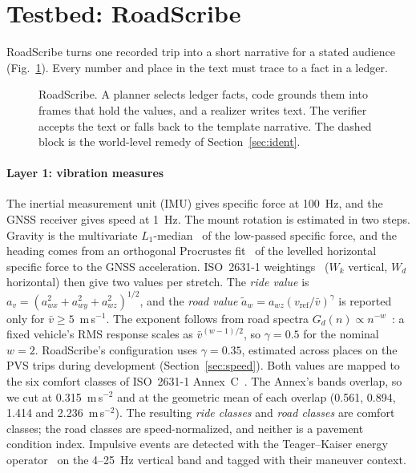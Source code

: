 \section{Testbed: RoadScribe}
\label{sec:system}

RoadScribe turns one recorded trip into a short narrative for a stated audience (Fig.~\ref{fig:arch}). Every number and place in the text must trace to a fact in a ledger.

\begin{figure}[t]
\centering

\caption{RoadScribe. A planner selects ledger facts, code grounds them into frames that hold the values, and a realizer writes text. The verifier accepts the text or falls back to the template narrative. The dashed block is the world-level remedy of Section~\ref{sec:ident}.}
\label{fig:arch}
\end{figure}

\paragraph*{Layer 1: vibration measures}
The inertial measurement unit (IMU) gives specific force at 100~Hz, and the GNSS receiver gives speed at 1~Hz.
The mount rotation is estimated in two steps. Gravity is the multivariate $L_1$-median~\cite{vardi2000l1median} of the low-passed specific force, and the heading comes from an orthogonal Procrustes fit~\cite{schonemann1966procrustes} of the levelled horizontal specific force to the GNSS acceleration. ISO~2631-1 weightings~\cite{iso2631} ($W_k$ vertical, $W_d$ horizontal) then give two values per stretch. The \emph{ride value} is $a_v=(a_{wx}^2+a_{wy}^2+a_{wz}^2)^{1/2}$, and the \emph{road value} $\tilde a_w=a_{wz}(v_{\mathrm{ref}}/\bar v)^{\gamma}$ is reported only for $\bar v\ge5$~m\,s$^{-1}$.
The exponent follows from road spectra $G_d(n)\propto n^{-w}$~\cite{iso8608}: a fixed vehicle's RMS response scales as $\bar v^{(w-1)/2}$, so $\gamma=0.5$ for the nominal $w=2$. RoadScribe's configuration uses $\gamma=0.35$, estimated across places on the PVS trips during development (Section~\ref{sec:speed}).
Both values are mapped to the six comfort classes of ISO~2631-1 Annex~C~\cite{iso2631}. The Annex's bands overlap, so we cut at 0.315~m\,s$^{-2}$ and at the geometric mean of each overlap (0.561, 0.894, 1.414 and 2.236~m\,s$^{-2}$). The resulting \emph{ride classes} and \emph{road classes} are comfort classes; the road classes are speed-normalized, and neither is a pavement condition index.
Impulsive events are detected with the Teager--Kaiser energy operator~\cite{kaiser1990tkeo} on the 4--25~Hz vertical band and tagged with their maneuver context.

